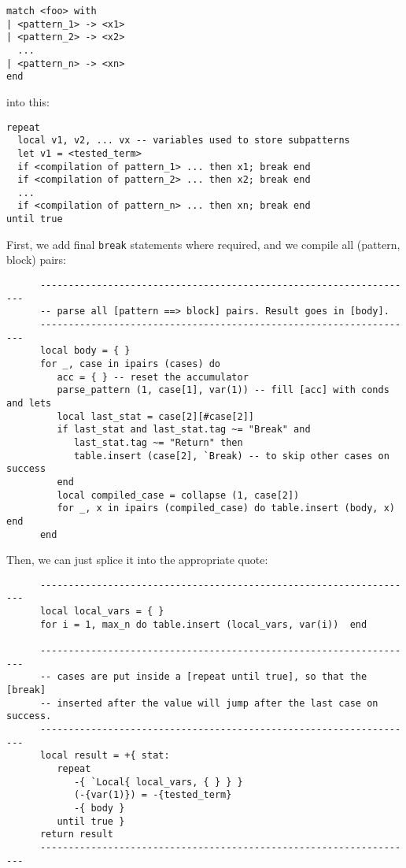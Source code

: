 \begin{verbatim}
match <foo> with
| <pattern_1> -> <x1>
| <pattern_2> -> <x2>
  ...
| <pattern_n> -> <xn>
end
\end{verbatim}

\noindent into this:

\begin{verbatim}
repeat
  local v1, v2, ... vx -- variables used to store subpatterns
  let v1 = <tested_term>
  if <compilation of pattern_1> ... then x1; break end
  if <compilation of pattern_2> ... then x2; break end
  ...
  if <compilation of pattern_n> ... then xn; break end
until true
\end{verbatim}

First, we add final \verb|break| statements where required, and we
compile all (pattern, block) pairs:

\begin{verbatim}
      -------------------------------------------------------------------
      -- parse all [pattern ==> block] pairs. Result goes in [body].
      -------------------------------------------------------------------
      local body = { }
      for _, case in ipairs (cases) do
         acc = { } -- reset the accumulator
         parse_pattern (1, case[1], var(1)) -- fill [acc] with conds and lets
         local last_stat = case[2][#case[2]]
         if last_stat and last_stat.tag ~= "Break" and 
            last_stat.tag ~= "Return" then
            table.insert (case[2], `Break) -- to skip other cases on success
         end
         local compiled_case = collapse (1, case[2])
         for _, x in ipairs (compiled_case) do table.insert (body, x) end
      end
\end{verbatim}

\noindent Then, we can just splice it into the appropriate quote:

\begin{verbatim}
      -------------------------------------------------------------------
      local local_vars = { }
      for i = 1, max_n do table.insert (local_vars, var(i))  end
      
      -------------------------------------------------------------------
      -- cases are put inside a [repeat until true], so that the [break]
      -- inserted after the value will jump after the last case on success.
      -------------------------------------------------------------------
      local result = +{ stat: 
         repeat
            -{ `Local{ local_vars, { } } }
            (-{var(1)}) = -{tested_term}
            -{ body }
         until true }
      return result
      -------------------------------------------------------------------
\end{verbatim}

